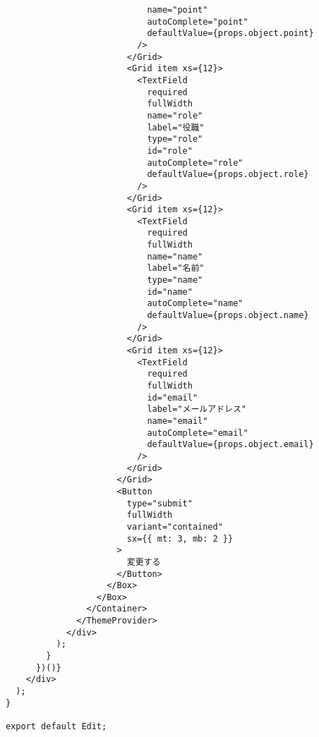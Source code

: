 \begin{verbatim}
                            name="point"
                            autoComplete="point"
                            defaultValue={props.object.point}
                          />
                        </Grid>
                        <Grid item xs={12}>
                          <TextField
                            required
                            fullWidth
                            name="role"
                            label="役職"
                            type="role"
                            id="role"
                            autoComplete="role"
                            defaultValue={props.object.role}
                          />
                        </Grid>
                        <Grid item xs={12}>
                          <TextField
                            required
                            fullWidth
                            name="name"
                            label="名前"
                            type="name"
                            id="name"
                            autoComplete="name"
                            defaultValue={props.object.name}
                          />
                        </Grid>
                        <Grid item xs={12}>
                          <TextField
                            required
                            fullWidth
                            id="email"
                            label="メールアドレス"
                            name="email"
                            autoComplete="email"
                            defaultValue={props.object.email}
                          />
                        </Grid>
                      </Grid>
                      <Button
                        type="submit"
                        fullWidth
                        variant="contained"
                        sx={{ mt: 3, mb: 2 }}
                      >
                        変更する
                      </Button>
                    </Box>
                  </Box>
                </Container>
              </ThemeProvider>
            </div>
          );
        }
      })()}
    </div>
  );
}

export default Edit;

\end{verbatim}